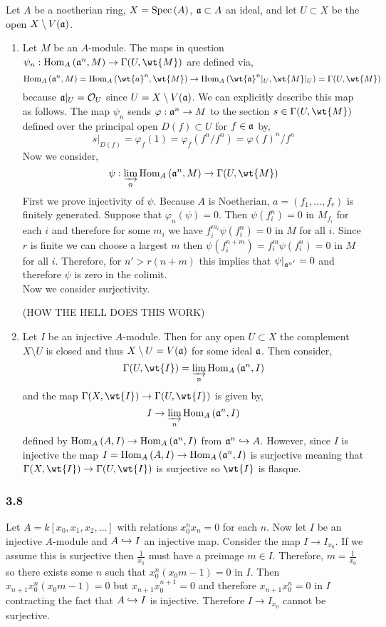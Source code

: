 \documentclass[12pt]{article}
\begin{document}
Let $A$ be a noetherian ring, $X = \mathrm{Spec}\left( A \right)$, $\mathfrak{a} \subset A$ an ideal, and let $U \subset X$ be the open $X \setminus V(\mathfrak{a})$. 
\begin{enumerate}
\item Let $M$ be an $A$-module. The maps in question $\psi_n : \Hom{A}{\a^n}{M} \to \Gamma(U, \wt{M})$ are defined via,
\[ \Hom{A}{\a^n}{M} = \Hom{A}{\wt{a}^n}{\wt{M}} \to \Hom{A}{\wt{\a}^n|_U}{\wt{M}|_U} = \Gamma(U, \wt{M}) \]
because $\mathfrak{a}|_U = \mathcal{O}_{U}$ since $U = X \setminus V(\mathfrak{a})$. We can explicitly describe this map as follows. The map $\psi_n$ sends $\varphi : \mathfrak{a}^n \to M$ to the section $s \in \Gamma(U, \wt{M})$ defined over the principal open $D(f) \subset U$ for $f \in \mathfrak{a}$ by,
\[ s|_{D(f)} = \varphi_{f}(1) = \varphi_{f}(f^n/f^n) = \varphi(f)^n / f^n \] 
Now we consider,
\[ \psi : \varinjlim_n \Hom{A}{\a^n}{M} \to \Gamma(U, \wt{M}) \]
First we prove injectivity of $\psi$. Because $A$ is Noetherian, $a = (f_1, \dots, f_r)$ is finitely generated. Suppose that $\varphi_n(\psi) = 0$. Then $\psi(f_i^n) = 0$ in $M_{f_i}$ for each $i$ and therefore for some $m_i$ we have $f_i^{m_i} \psi(f_i^n) = 0$ in $M$ for all $i$. Since $r$ is finite we can choose a largest $m$ then $\psi(f_i^{n+m}) = f_i^m \psi(f_i^n) = 0$ in $M$ for all $i$. Therefore, for $n' > r(n + m)$ this implies that $\psi|_{\mathfrak{a}^{n'}} = 0$ and therefore $\psi$ is zero in the colimit.
\bigskip\\ 
Now we consider surjectivity. 

(HOW THE HELL DOES THIS WORK)



\item Let $I$ be an injective $A$-module. Then for any open $U \subset X$ the complement $X \setminus U$ is closed and thus $X \setminus U = V(\mathfrak{a})$ for some ideal $\mathfrak{a}$. Then consider,
\[ \Gamma(U, \wt{I}) = \varinjlim_{n} \Hom{A}{\a^n}{I} \]
and the map $\Gamma(X, \wt{I}) \to \Gamma(U, \wt{I})$ is given by,
\[ I \to \varinjlim_{n} \mathrm{Hom}_{A} \left( \mathfrak{a}^n, I \right) \]
defined by $\mathrm{Hom}_{A} \left( A, I \right) \to \mathrm{Hom}_{A} \left( \mathfrak{a}^n, I \right)$ from $\mathfrak{a}^n \hookrightarrow A$. However, since $I$ is injective the map $I = \mathrm{Hom}_{A} \left( A, I \right) \to \mathrm{Hom}_{A} \left( \mathfrak{a}^n, I \right)$ is surjective meaning that $\Gamma(X, \wt{I}) \to \Gamma(U, \wt{I})$ is surjective so $\wt{I}$ is flasque.
\end{enumerate}

\subsubsection{3.8}

Let $A = k[x_0, x_1, x_2, \dots ]$ with relations $x_0^n x_n = 0$ for each $n$. Now let $I$ be an injective $A$-module and $A \hookrightarrow I$ an injective map. Consider the map $I \to I_{x_0}$. If we assume this is surjective then $\frac{1}{x_0}$ must have a preimage $m \in I$. Therefore, $m = \frac{1}{x_0}$ so there exists some $n$ such that $x_0^n(x_0 m - 1) = 0$ in $I$. Then $x_{n+1} x_0^n(x_0 m - 1) = 0$ but $x_{n+1} x_0^{n+1} = 0$ and therefore $x_{n+1} x_0^n = 0$ in $I$ contracting the fact that $A \hookrightarrow I$ is injective. Therefore $I \to I_{x_0}$ cannot be surjective.
\end{document}
